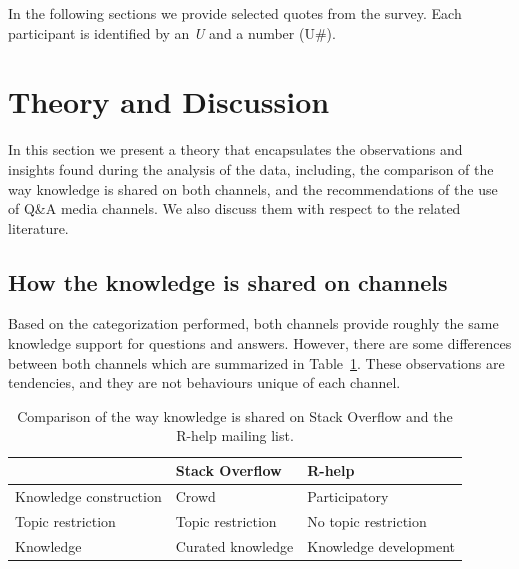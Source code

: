 \documentclass{sig-alternate-05-2015}
\begin{document}
In the following sections we provide selected quotes from the survey.
Each participant is identified by an \emph{U} and a number (U\#).


\section{Theory and Discussion}
\label{cha:theory}

	In this section we present a theory that encapsulates the observations and insights found during the analysis of the data, including, the comparison of the way knowledge is shared on both channels, and the recommendations of the use of Q\&A media channels.
We also discuss them with respect to the related literature.

\subsection{How the knowledge is shared on channels}

	Based on the categorization performed, both channels provide roughly the same knowledge support for questions and answers.
	However, there are some differences between both channels which are summarized in Table~\ref{table:constrat}.
	These observations are tendencies, and they are not behaviours unique of each channel.

    \begin{table}[!htb]
      \centering
	  \caption{Comparison of the way knowledge is shared on Stack Overflow and the R-help mailing list.}
	  \label{table:constrat}
      \begin{small}
	      \setlength{\tabcolsep}{5pt}
	      \begin{tabular}{@{}lll@{}}
            \toprule
            \textbf{}      & \textbf{Stack Overflow} & \textbf{R-help}\\
            \midrule
            Knowledge construction & Crowd             & Participatory \\
            Topic restriction      & Topic restriction & No topic restriction \\
            Knowledge              & Curated knowledge & Knowledge development\\
            \bottomrule
	      \end{tabular}
	  \end{small}
	\end{table}
\end{document}
